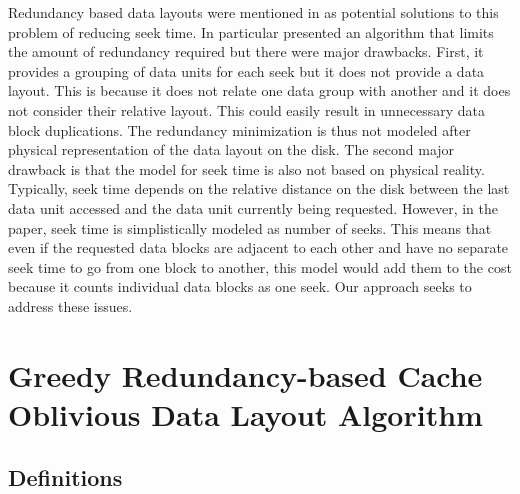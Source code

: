 \documentclass[conference]{acmsiggraph}
\begin{document}
Redundancy based data layouts were mentioned in \cite{Patterson88,singleseeklayout,optimizingredundancy} as potential solutions to this problem of reducing seek time. In particular \cite{optimizingredundancy} presented an algorithm that limits the amount of redundancy required but there were major drawbacks. First, it provides a grouping of data units for each seek but it does not provide a data layout. This is because it does not relate one data group with another and it does not consider their relative layout. This could easily result in unnecessary data block duplications. The redundancy minimization is thus not modeled after physical representation of the data layout on the disk. The second major drawback is that the model for seek time is also not based on physical reality. Typically, seek time depends on the relative distance on the disk between the last data unit accessed and the data unit currently being requested. However, in the paper, seek time is simplistically modeled as number of seeks. This means that even if the requested data blocks are adjacent to each other and have no separate seek time to go from one block to another, this model would add them to the cost because it counts individual data blocks as one seek. Our approach seeks to address these issues. 

\section{Greedy Redundancy-based Cache Oblivious Data Layout Algorithm}

\subsection{Definitions}
\end{document}
